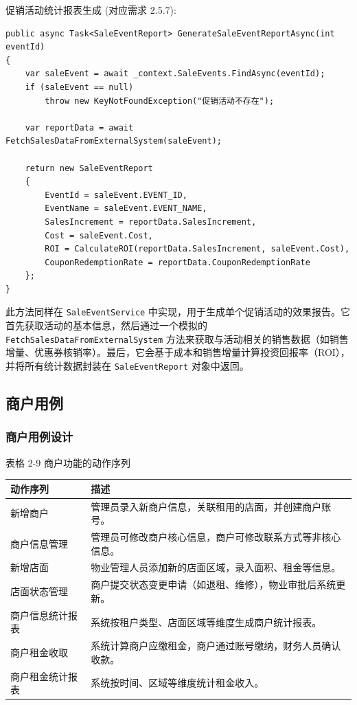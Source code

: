 \documentclass[]{article}
\begin{document}
促销活动统计报表生成 (对应需求 2.5.7):
\begin{verbatim}
public async Task<SaleEventReport> GenerateSaleEventReportAsync(int eventId)
{
    var saleEvent = await _context.SaleEvents.FindAsync(eventId);
    if (saleEvent == null)
        throw new KeyNotFoundException("促销活动不存在");
    
    var reportData = await FetchSalesDataFromExternalSystem(saleEvent);

    return new SaleEventReport
    {
        EventId = saleEvent.EVENT_ID,
        EventName = saleEvent.EVENT_NAME,
        SalesIncrement = reportData.SalesIncrement,
        Cost = saleEvent.Cost,
        ROI = CalculateROI(reportData.SalesIncrement, saleEvent.Cost),
        CouponRedemptionRate = reportData.CouponRedemptionRate
    };
}
\end{verbatim}
此方法同样在 \texttt{SaleEventService} 中实现，用于生成单个促销活动的效果报告。它首先获取活动的基本信息，然后通过一个模拟的 \texttt{FetchSalesDataFromExternalSystem} 方法来获取与活动相关的销售数据（如销售增量、优惠券核销率）。最后，它会基于成本和销售增量计算投资回报率（ROI），并将所有统计数据封装在 \texttt{SaleEventReport} 对象中返回。

\hypertarget{ux5546ux6237ux7528ux4f8b}{%
\subsection{商户用例}\label{ux5546ux6237ux7528ux4f8b}}

\hypertarget{ux5546ux6237ux7528ux4f8bux8bbeux8ba1}{%
\subsubsection{商户用例设计}\label{ux5546ux6237ux7528ux4f8bux8bbeux8ba1}}

表格 2-9 商户功能的动作序列
\begin{longtable}[]{@{}ll@{}}
\toprule
动作序列 & 描述\tabularnewline
\midrule
\endhead
新增商户 & 管理员录入新商户信息，关联租用的店面，并创建商户账号。\tabularnewline
商户信息管理 & 管理员可修改商户核心信息，商户可修改联系方式等非核心信息。\tabularnewline
新增店面 & 物业管理人员添加新的店面区域，录入面积、租金等信息。\tabularnewline
店面状态管理 & 商户提交状态变更申请（如退租、维修），物业审批后系统更新。\tabularnewline
商户信息统计报表 & 系统按租户类型、店面区域等维度生成商户统计报表。\tabularnewline
商户租金收取 & 系统计算商户应缴租金，商户通过账号缴纳，财务人员确认收款。\tabularnewline
商户租金统计报表 & 系统按时间、区域等维度统计租金收入。\tabularnewline
\bottomrule
\end{longtable}
\end{document}

